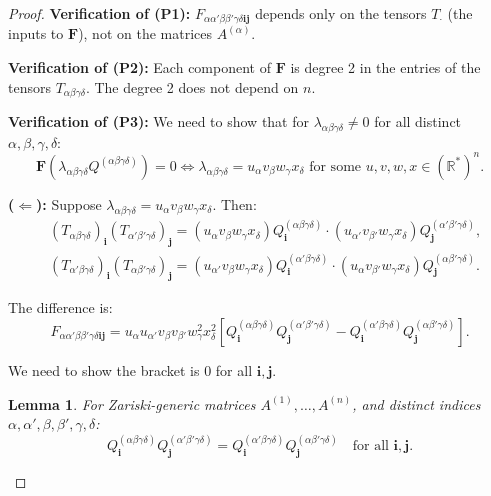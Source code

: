 \documentclass[12pt]{article}
\newtheorem{lemma}[theorem]{Lemma}
\begin{document}
\begin{proof}

\textbf{Verification of (P1):} $F_{\alpha\alpha'\beta\beta'\gamma\delta\mathbf{ij}}$ depends only on the tensors $T_{\cdot}$ (the inputs to $\mathbf{F}$), not on the matrices $A^{(\alpha)}$.

\textbf{Verification of (P2):} Each component of $\mathbf{F}$ is degree 2 in the entries of the tensors $T_{\alpha\beta\gamma\delta}$. The degree 2 does not depend on $n$.

\textbf{Verification of (P3):} We need to show that for $\lambda_{\alpha\beta\gamma\delta} \neq 0$ for all distinct $\alpha,\beta,\gamma,\delta$:
\[
\mathbf{F}(\lambda_{\alpha\beta\gamma\delta} Q^{(\alpha\beta\gamma\delta)}) = 0 \iff \lambda_{\alpha\beta\gamma\delta} = u_\alpha v_\beta w_\gamma x_\delta \text{ for some } u,v,w,x \in (\mathbb{R}^*)^n.
\]

\textbf{($\Leftarrow$):} Suppose $\lambda_{\alpha\beta\gamma\delta} = u_\alpha v_\beta w_\gamma x_\delta$. Then:
\begin{align*}
&(T_{\alpha\beta\gamma\delta})_\mathbf{i}(T_{\alpha'\beta'\gamma\delta})_\mathbf{j} = (u_\alpha v_\beta w_\gamma x_\delta) Q^{(\alpha\beta\gamma\delta)}_\mathbf{i} \cdot (u_{\alpha'} v_{\beta'} w_\gamma x_\delta) Q^{(\alpha'\beta'\gamma\delta)}_\mathbf{j}, \\
&(T_{\alpha'\beta\gamma\delta})_\mathbf{i}(T_{\alpha\beta'\gamma\delta})_\mathbf{j} = (u_{\alpha'} v_\beta w_\gamma x_\delta) Q^{(\alpha'\beta\gamma\delta)}_\mathbf{i} \cdot (u_\alpha v_{\beta'} w_\gamma x_\delta) Q^{(\alpha\beta'\gamma\delta)}_\mathbf{j}.
\end{align*}

The difference is:
\[
F_{\alpha\alpha'\beta\beta'\gamma\delta\mathbf{ij}} = u_\alpha u_{\alpha'} v_\beta v_{\beta'} w_\gamma^2 x_\delta^2 \left[Q^{(\alpha\beta\gamma\delta)}_\mathbf{i} Q^{(\alpha'\beta'\gamma\delta)}_\mathbf{j} - Q^{(\alpha'\beta\gamma\delta)}_\mathbf{i} Q^{(\alpha\beta'\gamma\delta)}_\mathbf{j}\right].
\]

We need to show the bracket is $0$ for all $\mathbf{i}, \mathbf{j}$.

\begin{lemma}\label{lem:Q-rank1}
For Zariski-generic matrices $A^{(1)}, \ldots, A^{(n)}$, and distinct indices $\alpha, \alpha', \beta, \beta', \gamma, \delta$:
\[
Q^{(\alpha\beta\gamma\delta)}_\mathbf{i} Q^{(\alpha'\beta'\gamma\delta)}_\mathbf{j} = Q^{(\alpha'\beta\gamma\delta)}_\mathbf{i} Q^{(\alpha\beta'\gamma\delta)}_\mathbf{j} \quad \text{for all } \mathbf{i}, \mathbf{j}.
\]
\end{lemma}


\end{proof}
\end{document}
